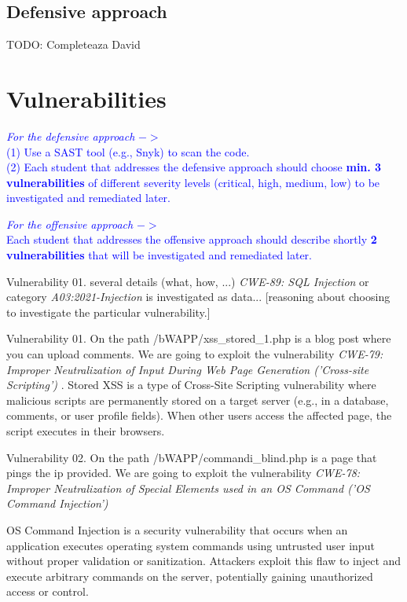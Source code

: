 \documentclass{article}
\begin{document}
\subsection{Defensive approach}
TODO: Completeaza David


\section{Vulnerabilities}
\label{}

\textcolor{blue}{\textit{For the defensive approach} $->$ \\(1) Use a SAST tool (e.g., Snyk) to scan the code.\\
    (2) Each student that addresses the defensive approach should choose \textbf{min. 3 vulnerabilities} of different severity levels (critical, high, medium, low) to be investigated and remediated later.}

\textcolor{blue}{\textit{For the offensive approach} $->$\\
    Each student that addresses the offensive approach should describe shortly \textbf{2 vulnerabilities} that will be investigated and remediated later.
}

Vulnerability 01. several details (what, how, ...) \textit{CWE-89: SQL Injection} or category \textit{A03:2021-Injection}  \cite{Vuln001} is investigated as data... [reasoning about choosing to investigate the particular vulnerability.]

Vulnerability 01. On the path /bWAPP/xss\_stored\_1.php is a blog post where you can upload comments.
We are going to exploit the vulnerability \textit{CWE-79: Improper Neutralization of Input During Web Page Generation ('Cross-site Scripting')} \cite{vul:xss}.
Stored XSS is a type of Cross-Site Scripting vulnerability where malicious scripts are permanently stored on a target server (e.g., in a database, comments, or user profile fields). When other users access the affected page, the script executes in their browsers.

Vulnerability 02. On the path /bWAPP/commandi\_blind.php is a page that pings the ip provided.
We are going to exploit the vulnerability \textit{CWE-78: Improper Neutralization of Special Elements used in an OS Command ('OS Command Injection')} \cite{vul:command-injection}

OS Command Injection is a security vulnerability that occurs when an application executes operating system commands using untrusted user input without proper validation or sanitization. Attackers exploit this flaw to inject and execute arbitrary commands on the server, potentially gaining unauthorized access or control.
\end{document}
